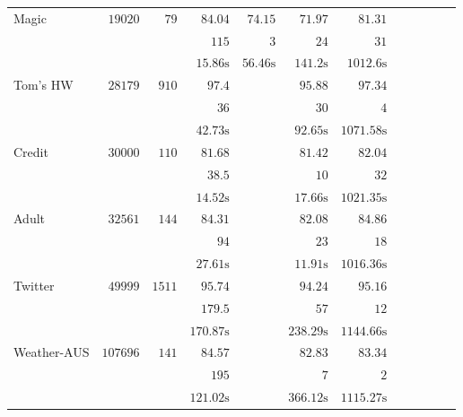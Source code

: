 \begin{table}
\begin{center}
\begin{tabular}{l  r  r r r r r r r rrr}
			{ Magic}   & $  19020 $  & $  79 $  & $   84.04  $    & $   74.15  $    & $   71.97  $    & $   81.31  $   \\ & & 
			& $   115 $    & $   3 $    & $   24 $    & $   31 $   \\ & & 
			& $   15.86 \text{s}  $    & $   56.46 \text{s}  $    & $   141.2 \text{s}  $    & $   1012.6 \text{s}  $   \\[.1cm] 
			{ Tom's HW}   & $  28179 $  & $  910 $  & $   97.4  $    &   \multicolumn{1}{c}{\multirow{3}{*}{\textemdash}}       & $   95.88  $    & $   97.34  $   \\ & & 
			& $   36 $    &       & $   30 $    & $   4 $   \\ & & 
			& $   42.73 \text{s}  $    &       & $   92.65 \text{s}  $    & $   1071.58 \text{s}  $   \\[.1cm] 
			{ Credit}   & $  30000 $  & $  110 $  & $   81.68  $    &   \multicolumn{1}{c}{\multirow{3}{*}{\textemdash}}       & $   81.42  $    & $   82.04  $   \\ & & 
			& $   38.5  $    &       & $   10 $    & $   32 $   \\ & & 
			& $   14.52 \text{s}  $    &       & $   17.66 \text{s}  $    & $   1021.35 \text{s}  $   \\[.1cm] 
			{ Adult}   & $  32561 $  & $  144 $  & $   84.31  $    &   \multicolumn{1}{c}{\multirow{3}{*}{\textemdash}}       & $   82.08  $    & $   84.86  $   \\ & & 
			& $   94 $    &       & $   23 $    & $   18 $   \\ & & 
			& $   27.61 \text{s}  $    &       & $   11.91 \text{s}  $    & $   1016.36 \text{s}  $   \\[.1cm] 
			{ Twitter}   & $  49999 $  & $  1511 $  & $   95.74  $    &   \multicolumn{1}{c}{\multirow{3}{*}{\textemdash}}       & $   94.24  $    & $   95.16  $   \\ & & 
			& $   179.5  $    &       & $   57 $    & $   12 $   \\ & & 
			& $   170.87 \text{s}  $    &       & $   238.29 \text{s}  $    & $   1144.66 \text{s}  $   \\[.1cm] 
			{ Weather-AUS}   & $  107696 $  & $  141 $  & $   84.57  $    &   \multicolumn{1}{c}{\multirow{3}{*}{\textemdash}}       & $   82.83  $    & $   83.34  $   \\ & & 
			& $   195 $    &       & $   7 $    & $   2 $   \\ & & 
			& $   121.02 \text{s}  $    &       & $   366.12 \text{s}  $    & $   1115.27 \text{s}  $   \\[.1cm] 

\end{tabular}
\end{center}
\end{table}
